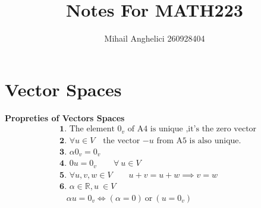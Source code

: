 \documentclass[
12pt,
]{article}
\title{Notes For MATH223}
\author{Mihail Anghelici 260928404}
\date{\empty}
\theoremstyle{definition}
\theoremstyle{definition}
\theoremstyle{definition}
\theoremstyle{definition}
\begin{document}
\maketitle
\section{Vector Spaces}
\textbf{Propreties of Vectors Spaces}
\begin{align*}
	&\textbf{1. } \text{The element $0_v$ of A4 is unique ,it's the zero vector} \\ 
	&\textbf{2. } \forall u \in V \quad \text{the vector $-u$ from A5 is also unique.} \\
	&\textbf{3. } \alpha 0_v = 0_v  \\
	&\textbf{4. } 0u = 0_v \qquad \forall \ u \in V  \\
	&\textbf{5. } \forall u, v, w \in V \qquad u+v =u+w \implies v=w \\
	&\textbf{6. } \alpha \in \mathbb{R} , u \ \in V \\
	&\hspace{10pt} \alpha u = 0_v \iff (\alpha=0) \ \text{or} \ (u=0_v)
\end{align*}
\end{document}
